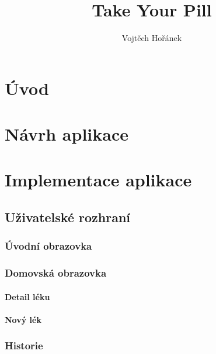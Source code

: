 \documentclass[a4paper,12pt]{report}
\title{Take Your Pill}
\author{Vojtěch Hořánek}
\begin{document}






\renewcommand\cftsecafterpnum{\vskip10pt}
\renewcommand\cftsubsecafterpnum{\vskip10pt}
\renewcommand\cftsubsubsecafterpnum{\vskip10pt}
\newpage
\tableofcontents %

\chapter*{Úvod}



\chapter{Návrh aplikace}


\chapter{Implementace aplikace}


\section{Uživatelské rozhraní}


\subsection{Úvodní obrazovka}


\subsection{Domovská obrazovka}


\subsubsection{Detail léku}
\subsubsection{Nový lék}
\subsection{Historie}
\end{document}
